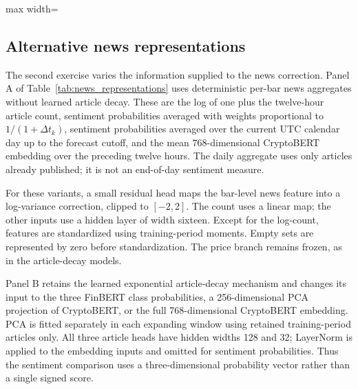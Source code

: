 \begin{table}[htbp]
\centering\small
\caption{Alternative decay specifications (4-Hour RV, BTC)}
\label{tab:decay_ablation}
\begin{adjustbox}{max width=\textwidth}

\end{adjustbox}
\end{table}



\subsection{Alternative news representations}
\label{sec:news_representations}

The second exercise varies the information supplied to the news
correction. Panel A of Table~\ref{tab:news_representations} uses
deterministic per-bar news aggregates without learned article decay.
These are the log of one plus the twelve-hour article count,
sentiment probabilities averaged with weights proportional to
$1/(1+\Delta t_k)$, sentiment probabilities averaged over the current
UTC calendar day up to the forecast cutoff, and the mean
768-dimensional CryptoBERT embedding over the preceding twelve hours.
The daily aggregate uses only articles already published; it is
not an end-of-day sentiment measure.

For these variants, a small residual head maps the bar-level news
feature into a log-variance correction, clipped to $[-2,2]$.
The count uses a linear map; the other inputs use a hidden layer
of width sixteen. Except for the log-count, features are standardized
using training-period moments. Empty sets are represented by zero
before standardization. The price branch remains frozen, as in the
article-decay models.

Panel B retains the learned exponential article-decay mechanism
and changes its input to the three FinBERT class probabilities,
a 256-dimensional PCA projection of CryptoBERT, or the full
768-dimensional CryptoBERT embedding. PCA is fitted separately in
each expanding window using retained training-period articles only.
All three article heads have hidden widths 128 and 32; LayerNorm
is applied to the embedding inputs and omitted for sentiment
probabilities. Thus the sentiment comparison uses a three-dimensional
probability vector rather than a single signed score.

